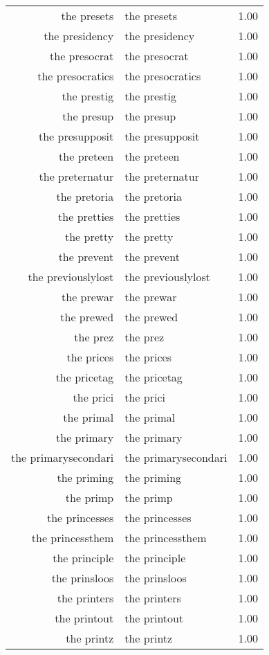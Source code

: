 \begin{table}[ht]
\begin{tabular}{rlr}
  the presets & the presets & 1.00 \\ 
  the presidency & the presidency & 1.00 \\ 
  the presocrat & the presocrat & 1.00 \\ 
  the presocratics & the presocratics & 1.00 \\ 
  the prestig & the prestig & 1.00 \\ 
  the presup & the presup & 1.00 \\ 
  the presupposit & the presupposit & 1.00 \\ 
  the preteen & the preteen & 1.00 \\ 
  the preternatur & the preternatur & 1.00 \\ 
  the pretoria & the pretoria & 1.00 \\ 
  the pretties & the pretties & 1.00 \\ 
  the pretty & the pretty & 1.00 \\ 
  the prevent & the prevent & 1.00 \\ 
  the previouslylost & the previouslylost & 1.00 \\ 
  the prewar & the prewar & 1.00 \\ 
  the prewed & the prewed & 1.00 \\ 
  the prez & the prez & 1.00 \\ 
  the prices & the prices & 1.00 \\ 
  the pricetag & the pricetag & 1.00 \\ 
  the prici & the prici & 1.00 \\ 
  the primal & the primal & 1.00 \\ 
  the primary & the primary & 1.00 \\ 
  the primarysecondari & the primarysecondari & 1.00 \\ 
  the priming & the priming & 1.00 \\ 
  the primp & the primp & 1.00 \\ 
  the princesses & the princesses & 1.00 \\ 
  the princessthem & the princessthem & 1.00 \\ 
  the principle & the principle & 1.00 \\ 
  the prinsloos & the prinsloos & 1.00 \\ 
  the printers & the printers & 1.00 \\ 
  the printout & the printout & 1.00 \\ 
  the printz & the printz & 1.00 \\ 

\end{tabular}
\end{table}

